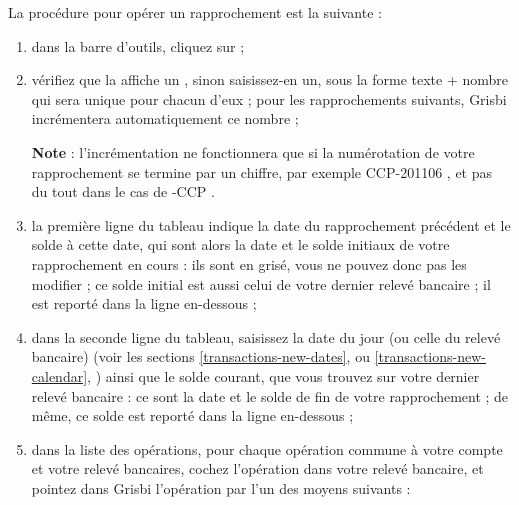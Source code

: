 La procédure pour opérer un rapprochement est la suivante :

\begin{enumerate}
	 \item dans la barre d'outils, cliquez sur  ;
	 \item vérifiez que la  affiche un , sinon saisissez-en un, sous la forme \og texte + nombre \fg{} qui sera unique pour chacun d'eux ; pour les rapprochements suivants, Grisbi incrémentera automatiquement ce nombre ;
 
\textbf{Note} : l'incrémentation ne fonctionnera que si la numérotation de votre rapprochement se termine par un chiffre, par exemple \og CCP-201106 \fg{}, et pas du tout dans le cas de -CCP \fg{}.
		
	 \item la première ligne du tableau indique la date du rapprochement précédent et le solde à cette date, qui sont alors la date et le solde initiaux de votre rapprochement en cours : ils sont en grisé, vous ne pouvez donc pas les modifier ; ce solde initial est aussi celui de votre dernier relevé bancaire ; il est reporté dans la ligne  en-dessous ;
	 \item dans la seconde ligne du tableau, saisissez la date du jour (ou celle du relevé bancaire) (voir les sections \vref{transactions-new-dates},  ou \vref{transactions-new-calendar}, ) ainsi que le solde courant, que vous trouvez sur votre dernier relevé bancaire : ce sont la date et le solde de fin de votre rapprochement ; de même, ce solde est reporté dans la ligne  en-dessous ;
	 \item dans la liste des opérations, pour chaque opération commune à votre compte et votre relevé bancaires, cochez l'opération dans votre relevé bancaire, et pointez dans Grisbi l'opération par l'un des moyens suivants :
	 

\end{enumerate}
